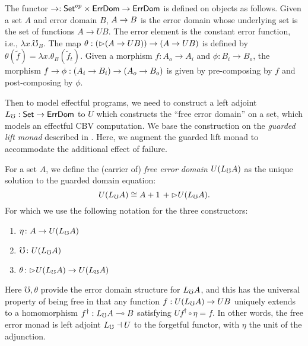 The functor $\to : \mathsf{Set}^{op} \times \textsf{ErrDom} \to \textsf{ErrDom}$ is defined on objects
as follows. Given a set $A$ and error domain $B$, $A \to B$ is the error domain
whose underlying set is the set of functions $A \to UB$. The error element is
the constant error function, i.e., $\lambda x. \mho_B$. The map $\theta :
({{\vartriangleright}} (A \to UB)) \to (A \to UB)$ is defined by 
$\theta(\tilde{f}) = \lambda x . \theta_B (\tilde{f}_t)$.
%
Given a morphism $f : A_o \to A_i$ and $\phi : B_i \to B_o$, the morphism $f
\to \phi : (A_i \to B_i) \to (A_o \to B_o)$ is given by pre-composing by $f$
and post-composing by $\phi$.

Then to model effectful programs, we need to construct a left adjoint
$L_\mho : \mathsf{Set} \to \mathsf{ErrDom}$ to $U$ which constructs the ``free error
domain'' on a set, which models an effectful CBV computation.
We base the construction on the \emph{guarded
lift monad} described in \cite{mogelberg-paviotti2016}. Here, we augment the
guarded lift monad to accommodate the additional effect of failure.
\begin{definition}
  For a set $A$, we define the (carrier of) \emph{free error domain} $U(L_\mho A)$ as the unique solution to the guarded domain equation:
  \[ U(L_\mho A) \cong A + 1\, + {{\vartriangleright}} U(L_\mho A). \]
  For which we use the following notation for the three constructors:
  \begin{enumerate}
  \item $\eta \colon A \to U(L_\mho A)$
  \item $\mho \colon U(L_\mho A)$
  \item $\theta \colon {{\vartriangleright}} U(L_\mho A) \to U(L_\mho A)$
  \end{enumerate}
  Here $\mho, \theta$ provide the error domain structure for $L_\mho A$,
  and this has the universal property of being free in that any
  function $f : U(L_\mho A) \to UB$ uniquely extends to a homomorphism
  $f^\dagger : L_\mho A \multimap B$ satisfying $Uf^\dagger \circ \eta =
  f$. In other words, the free error monad is left adjoint $L_\mho \dashv
  U$ to the forgetful functor, with $\eta$ the unit of the adjunction.
\end{definition}

